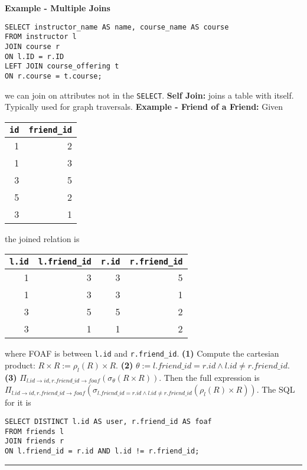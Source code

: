 \documentclass{report}
\renewcommand{\bf}[1]{\textbf{{#1}}}
\renewcommand{\tt}[1]{\texttt{{#1}}}
\begin{document}
\bf{Example - Multiple Joins}
\vspace{-1em}
\begin{verbatim}
SELECT instructor_name AS name, course_name AS course
FROM instructor l
JOIN course r
ON l.ID = r.ID
LEFT JOIN course_offering t
ON r.course = t.course;
\end{verbatim}
\vspace{-1em}
we can join on attributes not in the \tt{SELECT}.
\newpage
\bf{Self Join:} joins a table with itself. Typically used for graph traversals.
\hfil \newline
\bf{Example - Friend of a Friend:} Given
\hfil \newline
\begin{tabular}{r|r}
    \tt{id} & \tt{friend\_id} \\
    \hline
    1 & 2 \\
    1 & 3 \\
    3 & 5 \\
    5 & 2 \\
    3 & 1
\end{tabular}
the joined relation is
\begin{tabular}{r|r|r|r}
    \tt{l.id} & \tt{l.friend\_id} & \tt{r.id} & \tt{r.friend\_id} \\
    \hline
    1 & 3 & 3 & 5 \\
    1 & 3 & 3 & 1 \\
    3 & 5 & 5 & 2 \\
    3 & 1 & 1 & 2
\end{tabular}
where FOAF is between \tt{l.id} and \tt{r.friend\_id}.
\bf{(1)} Compute the cartesian product: $R \times R := \rho_l (R) \times R$.
\hfil \newline
\bf{(2)} $\theta := l.friend\_id = r.id \land l.id \neq r.friend\_id$.
\hfil \newline
\bf{(3)} $\Pi_{l.id \to id, r.friend\_id \to foaf}(\sigma_{\theta} (R \times R))$.
\hfil \newline
Then the full expression is $\Pi_{l.id \to id, r.friend\_id \to foaf}(\sigma_{l.friend\_id = r.id \land l.id \neq r.friend\_id} (\rho_l (R) \times R))$.
\hfil \newline
The SQL for it is
\vspace{-1em}
\begin{verbatim}
SELECT DISTINCT l.id AS user, r.friend_id AS foaf
FROM friends l
JOIN friends r
ON l.friend_id = r.id AND l.id != r.friend_id;
\end{verbatim}
\vspace{-0.8em}
\hrule
\vspace{0.2em}
\end{document}
